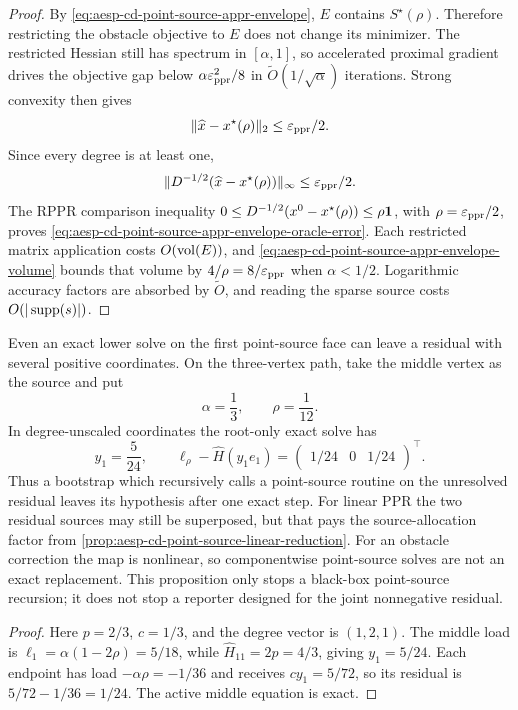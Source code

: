 \begin{proof}
By \cref{eq:aesp-cd-point-source-appr-envelope}, \(E\) contains
\(S^\star(\rho)\).  Therefore restricting the obstacle objective to \(E\)
does not change its minimizer.  The restricted Hessian still has spectrum in
\([\alpha,1]\), so accelerated proximal gradient drives the objective gap
below \(\alpha\varepsilon_{\mathrm{ppr}}^2/8\) in
\(\widetilde O(1/\sqrt\alpha)\) iterations.  Strong convexity then gives
\begin{equation*}
 \lVert\widehat x-x^\star(\rho)\rVert_2\leq\varepsilon_{\mathrm{ppr}}/2.
\end{equation*}
Since every degree is at least one,
\begin{equation*}
 \lVert D^{-1/2}(\widehat x-x^\star(\rho))\rVert_\infty
 \leq\varepsilon_{\mathrm{ppr}}/2.
\end{equation*}
The RPPR comparison inequality
\(0\leq D^{-1/2}(x^0-x^\star(\rho))\leq\rho\mathbf{1}\), with
\(\rho=\varepsilon_{\mathrm{ppr}}/2\), proves
\cref{eq:aesp-cd-point-source-appr-envelope-oracle-error}.  Each restricted
matrix application costs \(O(\operatorname{vol}(E))\), and
\cref{eq:aesp-cd-point-source-appr-envelope-volume} bounds that volume by
\(4/\rho=8/\varepsilon_{\mathrm{ppr}}\) when \(\alpha<1/2\).  Logarithmic accuracy factors are
absorbed by \(\widetilde O\), and reading the sparse source costs
\(O(|\operatorname{supp}(s)|)\).
\end{proof}

\begin{proposition}
\label{prop:aesp-cd-point-source-residual-recursion-stop}
Even an exact lower solve on the first point-source face can leave a residual
with several positive coordinates.  On the three-vertex path, take the
middle vertex as the source and put
\begin{equation*}
 \alpha=\frac13,
 \qquad \rho=\frac1{12}.
\end{equation*}
In degree-unscaled coordinates the root-only exact solve has
\begin{equation*}
 y_1=\frac{5}{24},
 \qquad
 \ell_\rho-\widehat H(y_1e_1)
 =\begin{pmatrix}1/24&0&1/24\end{pmatrix}^{\!\top}.
\end{equation*}
Thus a bootstrap which recursively calls a point-source routine on the
unresolved residual leaves its hypothesis after one exact step.  For linear
PPR the two residual sources may still be superposed, but that pays the
source-allocation factor from
\cref{prop:aesp-cd-point-source-linear-reduction}.  For an obstacle
correction the map is nonlinear, so componentwise point-source solves are
not an exact replacement.  This proposition only stops a black-box
point-source recursion; it does not stop a reporter designed for the joint
nonnegative residual.
\end{proposition}

\begin{proof}
Here $p=2/3$, $c=1/3$, and the degree vector is $(1,2,1)$.  The middle
load is
$\ell_1=\alpha(1-2\rho)=5/18$, while
$\widehat H_{11}=2p=4/3$, giving $y_1=5/24$.  Each endpoint has load
$-\alpha\rho=-1/36$ and receives $cy_1=5/72$, so its residual is
$5/72-1/36=1/24$.  The active middle equation is exact.
\end{proof}
